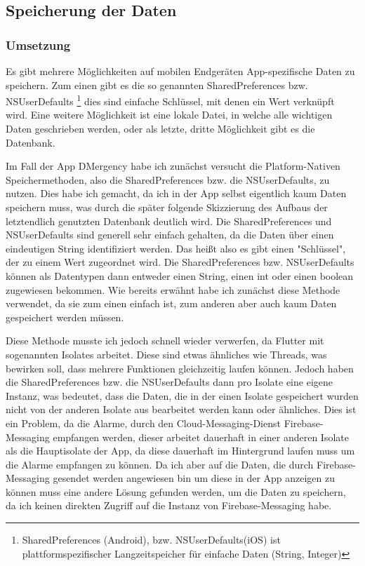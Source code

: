 \subsection{Speicherung der Daten}
\subsubsection{Umsetzung}
    Es gibt mehrere Möglichkeiten auf mobilen Endgeräten App-spezifische Daten zu speichern.
    Zum einen gibt es die so genannten SharedPreferences bzw. NSUserDefaults
    \footnote{SharedPreferences (Android), bzw. NSUserDefaults(iOS) ist plattformspezifischer Langzeitspeicher für einfache Daten (String, Integer)}
    dies sind einfache Schlüssel, mit denen ein Wert verknüpft wird.
    Eine weitere Möglichkeit ist eine lokale Datei, in welche alle wichtigen Daten geschrieben werden, oder als letzte, dritte Möglichkeit gibt es
    die Datenbank.

    Im Fall der App DMergency habe ich zunächst versucht die Platform-Nativen Speichermethoden, also die SharedPreferences bzw. die NSUserDefaults, zu nutzen.
    Dies habe ich gemacht, da ich in der App selbst eigentlich kaum Daten speichern muss, was durch die später folgende Skizzierung des Aufbaus der letztendlich genutzten Datenbank deutlich wird.
    Die SharedPreferences und NSUserDefaults sind generell sehr einfach gehalten, da die Daten über einen eindeutigen String identifiziert werden. Das heißt also es gibt einen "Schlüssel", der zu einem Wert zugeordnet wird.
    Die SharedPreferences bzw. NSUserDefaults können als Datentypen dann entweder einen String, einen int oder einen boolean zugewiesen bekommen.
    Wie bereits erwähnt habe ich zunächst diese Methode verwendet, da sie zum einen einfach ist, zum anderen aber auch kaum Daten gespeichert werden müssen.

    Diese Methode musste ich jedoch schnell wieder verwerfen, da Flutter mit sogenannten Isolates arbeitet. Diese sind etwas ähnliches wie Threads, was bewirken soll, dass mehrere Funktionen gleichzeitig laufen können.
    Jedoch haben die SharedPreferences bzw. die NSUserDefaults dann pro Isolate eine eigene Instanz, was bedeutet, dass die Daten, die in der einen Isolate gespeichert wurden nicht von der anderen Isolate aus bearbeitet werden kann oder ähnliches.
    Dies ist ein Problem, da die Alarme, durch den Cloud-Messaging-Dienst Firebase-Messaging empfangen werden, dieser arbeitet dauerhaft in einer anderen Isolate als die Hauptisolate der App, da diese dauerhaft im Hintergrund laufen muss um die Alarme
    empfangen zu können. 
    Da ich aber auf die Daten, die durch Firebase-Messaging gesendet werden angewiesen bin um diese in der App anzeigen zu können muss eine andere Lösung gefunden werden, um die Daten zu speichern, da ich keinen direkten Zugriff auf die Instanz von Firebase-Messaging habe.

